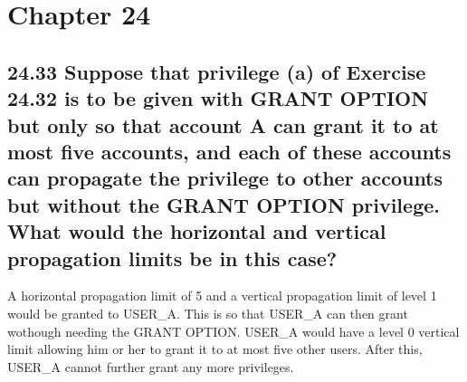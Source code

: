 \section*{Chapter 24}


\subsection*{24.33 Suppose that privilege (a) of Exercise 24.32 is to be given with GRANT OPTION but only so that account A can grant it to at most five accounts, and each of these accounts can propagate the privilege to other accounts but without the GRANT OPTION privilege. What would the horizontal and vertical propagation limits be in this case?}

A horizontal propagation limit of 5 and a vertical propagation limit of level 1 would be granted to USER\_A. This is so that USER\_A can then grant wothough needing the  GRANT OPTION. USER\_A would have a level 0 vertical limit allowing him or her to grant it to at most five other users. After this, USER\_A cannot further grant any more privileges.